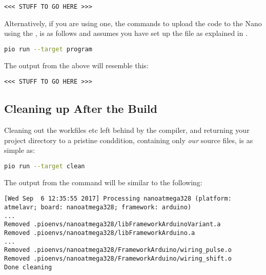 \begin{lstlisting}[numbers={none},caption={PIO - Uploading the Firmware - Output}]
<<< STUFF TO GO HERE >>>
\end{lstlisting}

Alternatively, if you are using one, the commands to upload the code to the Nano using the , is as follows and assumes you have set up the  file as explained in .

\begin{lstlisting}[language={bash},numbers={none},caption={PIO - Programming the Firmware with the ISP Programmer}]
pio run --target program
\end{lstlisting}    

The output from the above will resemble this:

\begin{lstlisting}[numbers={none},caption={PIO - Programming the Firmware - Output}]
<<< STUFF TO GO HERE >>>
\end{lstlisting}


\subsection{Cleaning up After the Build}\label{cleaning-up-after-the-build}

Cleaning out the workfiles etc left behind by the compiler, and returning your project directory to a pristine conddition, containing only \emph{our} source files, is as simple as:

\begin{lstlisting}[language={bash},numbers={none},caption={PIO - Project Cleaning}]
pio run --target clean
\end{lstlisting}    

The output from the  command will be similar to the following:

\begin{lstlisting}[numbers={none},caption={PIO - Project Cleaning - Results}]
[Wed Sep  6 12:35:55 2017] Processing nanoatmega328 (platform: atmelavr; board: nanoatmega328; framework: arduino)
...
Removed .pioenvs/nanoatmega328/libFrameworkArduinoVariant.a
Removed .pioenvs/nanoatmega328/libFrameworkArduino.a
...
Removed .pioenvs/nanoatmega328/FrameworkArduino/wiring_pulse.o
Removed .pioenvs/nanoatmega328/FrameworkArduino/wiring_shift.o
Done cleaning
\end{lstlisting}    

